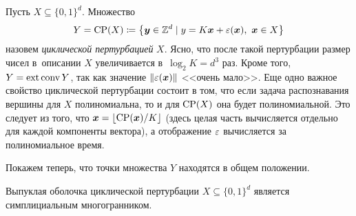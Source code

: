 Пусть $X\subseteq \{0, 1\}^d$.
Множество 
\[
Y = \textup{CP}(X) \coloneqq \bigl\{\bm{y}\in\mathbb{Z}^d \mid y = K \bm{x} + \varepsilon(\bm{x}), \ \bm{x}\in X\bigr\} 
\]
назовем \emph{циклической пертурбацией} $X$.
Ясно, что после такой пертурбации размер чисел в~описании $X$ увеличивается в~$\log_2 K = d^3$ раз.
Кроме того, $Y = \operatorname{ext} \operatorname{conv} Y$, так как значение $\|\varepsilon(\bm{x})\|$ <<очень мало>>.
Еще одно важное свойство циклической пертурбации состоит в том,
что если задача распознавания вершины для $X$ полиномиальна,
то и для $\textup{CP}(X)$ она будет полиномиальной. Это следует из того, что $\bm{x} = \lfloor\textup{CP}(\bm{x}) / K\rfloor$ (здесь целая часть вычисляется отдельно для каждой компоненты вектора), а отображение $\varepsilon$ вычисляется за полиномиальное время.

Покажем теперь, что точки множества $Y$ находятся в общем положении.

\begin{lemma}
	Выпуклая оболочка циклической пертурбации $X\subseteq \{0,1\}^d$ является симплициальным многогранником.
\end{lemma}

